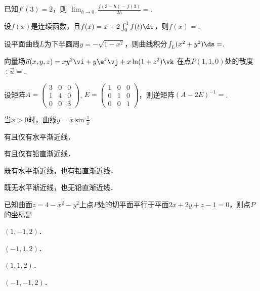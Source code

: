 \documentclass[plain,noanswer,medmath]{../../template/jnuexam}
\begin{document}




\begin{problem}
已知$f'(3)=2$，则 $\lim_{h\to 0}\,\frac{f(3-h)-f(3)}{2h}=$\fillin{}.
\end{problem}


\begin{problem}
设$f(x)$是连续函数，且$f(x)=x+2\int_0^1f(t) \dt$，则$f(x)=$\fillin{}.
\end{problem}


\begin{problem}
设平面曲线$L$为下半圆周$y=-\sqrt{1-x^2}$，则曲线积分$\int_L (x^2+y^2)\ds=$\fillin{}.
\end{problem}


\begin{problem}
向量场$\vec{u}(x,y,z)=xy^2\vi+y\e^z\vj+x\ln(1+z^2)\vk$
在点$P(1,1,0)$处的散度$\div\vec{u}=$\fillin{}.
\end{problem}


\begin{problem}
设矩阵$A=\begin{pmatrix}
  3 & 0 & 0 \\
  1 & 4 & 0 \\
  0 & 0 & 3
\end{pmatrix}$, $E=\begin{pmatrix}
  1 & 0 & 0 \\
  0 & 1 & 0 \\
  0 & 0 & 1
\end{pmatrix}$，则逆矩阵$(A-2E)^{-1}=$\fillin{}.
\end{problem}




\begin{problem}
当$x>0$时，曲线$y=x\sin\frac{1}{x}$\pickout{}
\begin{abcd}
\item 有且仅有水平渐近线．
\item 有且仅有铅直渐近线．
\item 既有水平渐近线，也有铅直渐近线．
\item 既无水平渐近线，也无铅直渐近线．
\end{abcd}
\end{problem}


\begin{problem}
已知曲面$z=4-x^2-y^2$上点$P$处的切平面平行于平面$2x+2y+z-1=0$，则点$P$的坐标是\pickout{}
\begin{abcd}
\item $(1,-1,2)$．
\item $(-1,1,2)$．
\item $(1,1,2)$．
\item $(-1,-1,2)$．
\end{abcd}
\end{problem}
\end{document}
